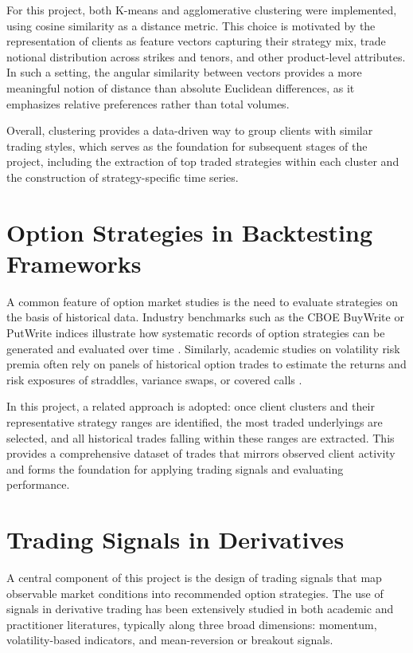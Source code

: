 \documentclass[12pt,a4paper]{report}
\begin{document}
For this project, both K-means and agglomerative clustering were implemented, using cosine similarity as a distance metric. This choice is motivated by the representation of clients as feature vectors capturing their strategy mix, trade notional distribution across strikes and tenors, and other product-level attributes. In such a setting, the angular similarity between vectors provides a more meaningful notion of distance than absolute Euclidean differences, as it emphasizes relative preferences rather than total volumes. 

Overall, clustering provides a data-driven way to group clients with similar trading styles, which serves as the foundation for subsequent stages of the project, including the extraction of top traded strategies within each cluster and the construction of strategy-specific time series.

\section{Option Strategies in Backtesting Frameworks}

A common feature of option market studies is the need to evaluate strategies on the basis of historical data. Industry benchmarks such as the CBOE BuyWrite or PutWrite indices illustrate how systematic records of option strategies can be generated and evaluated over time \citep{cboe2016indices}. Similarly, academic studies on volatility risk premia often rely on panels of historical option trades to estimate the returns and risk exposures of straddles, variance swaps, or covered calls \citep{bollerslev2009volatility, driessen2009pricing}. 

In this project, a related approach is adopted: once client clusters and their representative strategy ranges are identified, the most traded underlyings are selected, and all historical trades falling within these ranges are extracted. This provides a comprehensive dataset of trades that mirrors observed client activity and forms the foundation for applying trading signals and evaluating performance.

\section{Trading Signals in Derivatives}

A central component of this project is the design of trading signals that map observable market conditions into recommended option strategies. The use of signals in derivative trading has been extensively studied in both academic and practitioner literatures, typically along three broad dimensions: momentum, volatility-based indicators, and mean-reversion or breakout signals.
\end{document}

